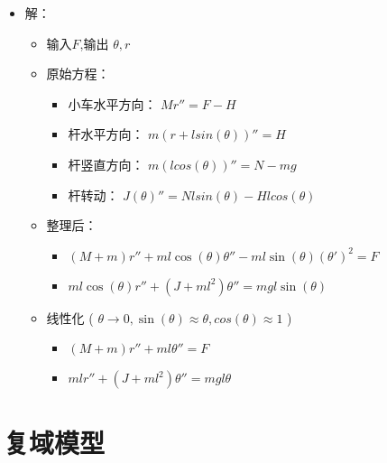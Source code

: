 \documentclass{article}
\begin{document}
\begin{frame}
\begin{itemize}



\item 解：\\
\label{sec-1-5-1-2}%
\begin{itemize}
\item 输入$F$,输出 $\theta,r$
\item 原始方程：
\begin{itemize}
\item 小车水平方向： $Mr''=F-H$
\item 杆水平方向： $m(r+l sin(\theta))'' = H$
\item 杆竖直方向： $m (l cos(\theta))'' = N-mg$
\item 杆转动： $J(\theta)''=N l sin(\theta) - H l cos(\theta)$
\end{itemize}
\item 整理后：
\begin{itemize}
\item $(M+m)r''+ml\cos(\theta)\theta''-ml\sin(\theta)(\theta')^2=F$
\item $ml\cos(\theta)r''+(J+m l^2)\theta''=mgl\sin(\theta)$
\end{itemize}
\item 线性化 ( $\theta\rightarrow 0,\sin(\theta)\approx \theta,cos(\theta)\approx 1$ )
\begin{itemize}
\item $(M+m)r''+ml\theta'' = F$
\item $ml r'' +(J+ml^2)\theta''=mgl\theta$
\end{itemize}
\end{itemize}




\end{itemize} %
\end{frame}
\section{复域模型}
\label{sec-2}
\end{document}
